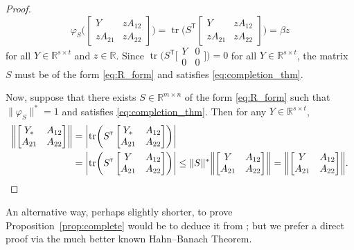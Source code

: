 \documentclass[11pt,reqno]{amsart}
\newcommand{\tp}{{\scriptscriptstyle\mathsf{T}}}
\DeclareMathOperator{\tr}{tr}
\theoremstyle{definition}
\numberwithin{equation}{section}
\newcommand{\R}{\mathbb{R}}
\begin{document}
\begin{proof}
\[
\varphi_S\biggl( \begin{bmatrix}
    Y &zA_{12}\\
    zA_{21} &zA_{22}
\end{bmatrix} \biggr) =
\tr\biggl( S^\tp \begin{bmatrix}
    Y &zA_{12}\\
    zA_{21} &zA_{22}
\end{bmatrix} \biggr)=\beta z
\]
for all $Y\in \R^{s \times t}$ and $z \in \R$. Since 
$
\tr \bigl( S^\tp 
\bigl[\begin{smallmatrix}
    Y &0\\
    0 &0
\end{smallmatrix}\bigr] \bigr) = 0
$
for all $Y \in \R^{s \times t}$, the matrix $S$ must be of the form \eqref{eq:R_form} and satisfies \eqref{eq:completion_thm}.

Now, suppose that there exists $S\in \R^{m \times n}$ of the form \eqref{eq:R_form} such that $\lVert \varphi_S \rVert^*=1$ and satisfies \eqref{eq:completion_thm}. Then for any $Y\in \R^{s \times t}$,
\begin{align*}
    \biggl\lVert  \begin{bmatrix}
        Y_* & A_{12} \\
    A_{21} & A_{22}
    \end{bmatrix}  \biggr\rVert &= \biggl\lvert \tr\biggl(S^\tp  \begin{bmatrix}
        Y_* & A_{12} \\
    A_{21} & A_{22}
    \end{bmatrix} \biggr) \biggr\rvert \\
    &= \biggl\lvert \tr\biggl(S^\tp  \begin{bmatrix}
        Y & A_{12} \\
    A_{21} & A_{22}
    \end{bmatrix} \biggr) \biggr\rvert\le \lVert S\rVert^* \biggl\lVert  \begin{bmatrix}
        Y & A_{12} \\
    A_{21} & A_{22}
    \end{bmatrix}  \biggr\rVert = \biggl\lVert  \begin{bmatrix}
        Y & A_{12} \\
    A_{21} & A_{22}
    \end{bmatrix}  \biggr\rVert. \qedhere
\end{align*}
\end{proof}
An alternative way, perhaps slightly shorter, to prove Proposition~\ref{prop:complete} would be to deduce it from \cite[Theorem~1.1]{Singer}; but we prefer a direct proof via the much better known Hahn--Banach Theorem.
\end{document}
